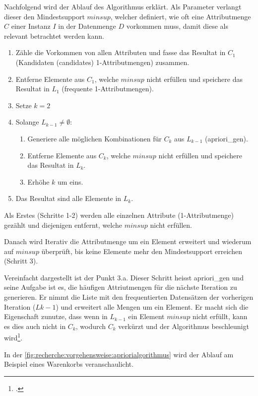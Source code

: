 Nachfolgend wird der Ablauf des Algorithmus erklärt.
Als Parameter verlangt dieser den Mindestsupport $minsup$, welcher definiert, wie oft eine Attributmenge $C$ einer Instanz $I$ in der Datenmenge $D$ vorkommen muss, damit diese als relevant betrachtet werden kann.
\begin{enumerate}
	\item Zähle die Vorkommen von allen Attributen und fasse das Resultat in $C_1$ (Kandidaten (candidates) 1-Attributmengen) zusammen.
	\item Entferne Elemente aus $C_1$, welche $minsup$ nicht erfüllen und speichere das Resultat in $L_1$ (frequente 1-Attributmengen).
	\item Setze $k=2$
	\item Solange $L_{k-1} \neq \emptyset$:
	\begin {enumerate}
	\item Generiere alle möglichen Kombinationen für $C_k$ aus $L_{k-1}$ (apriori\_gen).
	\item Entferne Elemente aus $C_k$, welche $minsup$ nicht erfüllen und speichere das Resultat in $L_k$.
	\item Erhöhe $k$ um eins.
\end{enumerate}
\item Das Resultat sind alle Elemente in $L_k$.
\end{enumerate}

Als Erstes (Schritte 1-2) werden alle einzelnen Attribute (1-Attributmenge) gezählt und diejenigen entfernt, welche $minsup$ nicht erfüllen.

Danach wird Iterativ die Attributmenge um ein Element erweitert und wiederum auf $minsup$ überprüft, bis keine Elemente mehr den Mindestsupport erreichen (Schritt 3).

Vereinfacht dargestellt ist der Punkt 3.a. Dieser Schritt heisst apriori\_gen und seine Aufgabe ist es, die häufigen Attriutmengen für die nächste Iteration zu generieren. Er nimmt die Liste mit den frequentierten Datensätzen der vorherigen Iteration ($L{k-1}$) und erweitert alle Mengen um ein Element. Er macht sich die Eigenschaft zunutze, dass wenn in $L_{k-1}$ ein Element $minsup$ nicht erfüllt, kann es dies auch nicht in $C_k$, wodurch $C_k$ verkürzt und der Algorithmus beschleunigt wird\footcite{data_mining_concepts_and_techniques}.

In der \cref{fig:recherche:vorgehensweise:apriorialgorithmus} wird der Ablauf am Beispiel eines Warenkorbs veranschaulicht.

